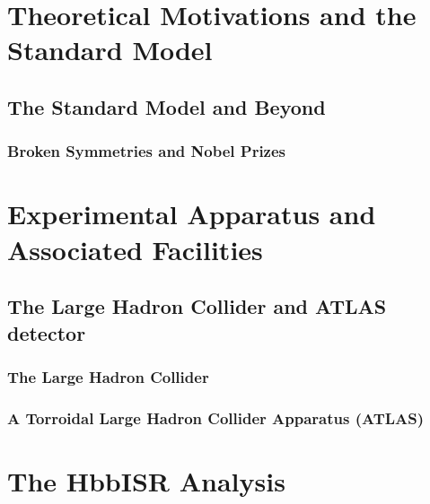 \documentclass[11pt]{ucthesis}
\begin{document}
\part{Theoretical Motivations and the Standard Model}


\chapter{The Standard Model and Beyond}

\label{sec:standard_model}


\section{Broken Symmetries and Nobel Prizes}

\label{sec:higgs}


\part{Experimental Apparatus and Associated Facilities}


\chapter{The Large Hadron Collider and ATLAS detector}

\label{sec:experiment.tex}


\section{The Large Hadron Collider}

\label{sec:large_hadron_collider.tex}


\section{A Torroidal Large Hadron Collider Apparatus (ATLAS)}

\label{sec:atlas.tex}



\part{The HbbISR Analysis}
\end{document}
